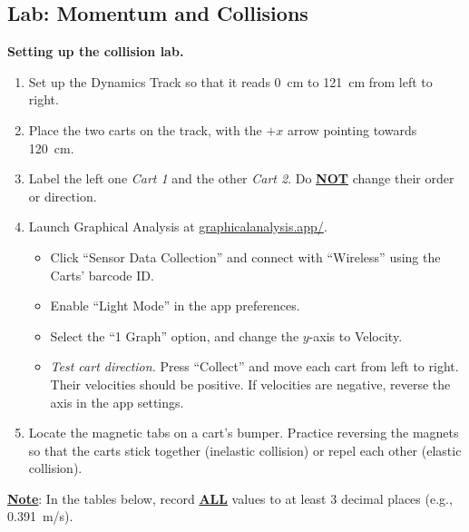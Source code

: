 \documentclass[]{exam}
\begin{document}
\begin{questions}
\subsection*{Lab: Momentum and Collisions}

\begin{mdframed}
\textbf{Setting up the collision lab.}
\begin{enumerate}[topsep=0pt]
    \item Set up the Dynamics Track so that it reads \SI{0}{cm} to \SI{121}{cm} from left to right.
    \item Place the two carts on the track, with the $+x$ arrow pointing towards \SI{120}{cm}.

    \begin{center}
    \end{center}

    \item Label the left one \textit{Cart 1} and the other \textit{Cart 2}. Do \textbf{\underline{NOT}} change their order or direction.
    \item Launch Graphical Analysis at \href{https://graphicalanalysis.app/}{graphicalanalysis.app/}.
    \begin{itemize}
        \item Click ``Sensor Data Collection'' and connect with ``Wireless'' using the Carts' barcode ID.
        \item Enable ``Light Mode'' in the app preferences.
        \item Select the ``1 Graph'' option, and change the $y$-axis to Velocity.
        \item \textit{Test cart direction.} Press ``Collect'' and move each cart from left to right. Their velocities should be positive. If velocities are negative, reverse the axis in the app settings.
    \end{itemize}
    \item Locate the magnetic tabs on a cart's bumper. Practice reversing the magnets so that the carts stick together (inelastic collision) or repel each other (elastic collision).
\end{enumerate}
\textbf{\underline{Note}}: In the tables below, record \textbf{\underline{ALL}} values to at least 3 decimal places (e.g., \SI{0.391}{m/s}).
\end{mdframed}


\end{questions}
\end{document}
